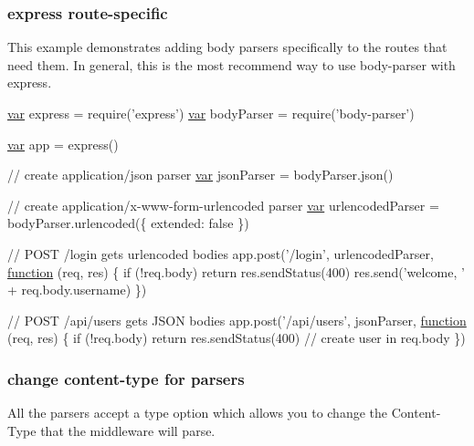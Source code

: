 \subsubsection*{express route-\/specific}

This example demonstrates adding body parsers specifically to the routes that need them. In general, this is the most recommend way to use body-\/parser with express.


\begin{DoxyCode}
\hyperlink{018__def_8c_a335628f2e9085305224b4f9cc6e95ed5}{var} express = require(\textcolor{stringliteral}{'express'})
\hyperlink{018__def_8c_a335628f2e9085305224b4f9cc6e95ed5}{var} bodyParser = require('body-parser')

\hyperlink{018__def_8c_a335628f2e9085305224b4f9cc6e95ed5}{var} app = express()

\textcolor{comment}{// create application/json parser}
\hyperlink{018__def_8c_a335628f2e9085305224b4f9cc6e95ed5}{var} jsonParser = bodyParser.json()

\textcolor{comment}{// create application/x-www-form-urlencoded parser}
\hyperlink{018__def_8c_a335628f2e9085305224b4f9cc6e95ed5}{var} urlencodedParser = bodyParser.urlencoded(\{ extended: \textcolor{keyword}{false} \})

\textcolor{comment}{// POST /login gets urlencoded bodies}
app.post(\textcolor{stringliteral}{'/login'}, urlencodedParser, \hyperlink{class_test_a51a683fa4fcec142ab1574e00a7b6860}{function} (req, res) \{
  \textcolor{keywordflow}{if} (!req.body) \textcolor{keywordflow}{return} res.sendStatus(400)
  res.send(\textcolor{stringliteral}{'welcome, '} + req.body.username)
\})

\textcolor{comment}{// POST /api/users gets JSON bodies}
app.post(\textcolor{stringliteral}{'/api/users'}, jsonParser, \hyperlink{class_test_a51a683fa4fcec142ab1574e00a7b6860}{function} (req, res) \{
  \textcolor{keywordflow}{if} (!req.body) \textcolor{keywordflow}{return} res.sendStatus(400)
  \textcolor{comment}{// create user in req.body}
\})
\end{DoxyCode}


\subsubsection*{change content-\/type for parsers}

All the parsers accept a {\ttfamily type} option which allows you to change the {\ttfamily Content-\/\+Type} that the middleware will parse.


